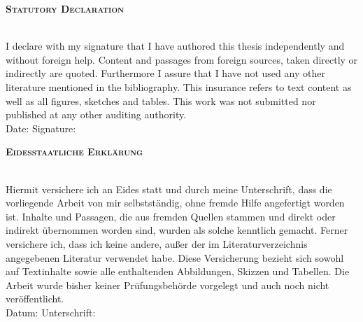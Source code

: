 
\begin{center}
\large \textsc{\textbf{Statutory Declaration}} \\
~\\ %



\end{center}

I declare with my signature that I have authored this thesis independently and without foreign help. Content and passages from foreign sources, taken directly or indirectly are quoted. Furthermore I assure that I have not used any other literature mentioned in the bibliography. This insurance refers to text content as well as all figures, sketches and tables. This work was not submitted nor published at any other auditing authority.
\\[1.5cm]
Date:	\hrulefill\enspace Signature: \hrulefill
\\[3.5cm]


\begin{center}
\large \textsc{ \textbf{Eidesstaatliche Erkl\"arung} } \\
~\\ %
\end{center}

Hiermit versichere ich an Eides statt und durch meine Unterschrift, dass die vorliegende Arbeit von mir selbstständig, ohne fremde Hilfe angefertigt worden ist. Inhalte und Passagen, die aus fremden Quellen stammen und direkt oder indirekt übernommen worden sind, wurden als solche kenntlich gemacht. Ferner versichere ich, dass ich keine andere, außer der im Literaturverzeichnis angegebenen Literatur verwendet habe. Diese Versicherung bezieht sich sowohl auf Textinhalte sowie alle enthaltenden Abbildungen, Skizzen und Tabellen. Die Arbeit wurde bisher keiner Prüfungsbehörde vorgelegt und auch noch nicht veröffentlicht. 
\\[1.5cm]
Datum:	\hrulefill\enspace Unterschrift: \hrulefill
\\[3.5cm]